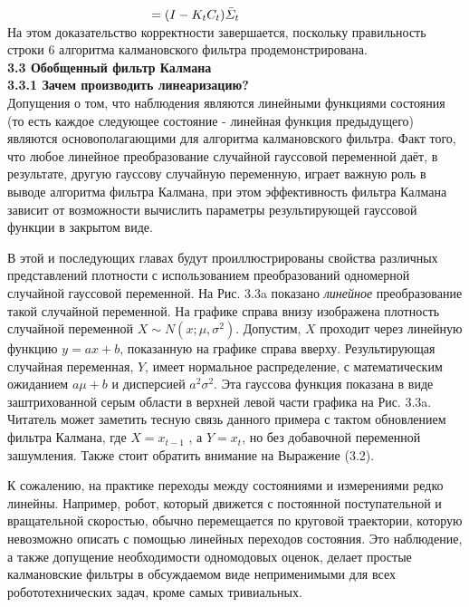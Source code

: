 \documentclass[10pt,a4paper]{article}
\begin{document}
$\hspace{40mm}=(I-K_t C_t)\bar{\varSigma}_t$\\

На этом доказательство корректности завершается, поскольку правильность строки 6 алгоритма калмановского фильтра продемонстрирована.\\

\textbf{3.3 Обобщенный фильтр Калмана}\\
 
\textbf{3.3.1 Зачем производить линеаризацию?}\\

Допущения о том, что наблюдения являются линейными функциями состояния (то есть каждое следующее состояние - линейная функция предыдущего) являются основополагающими для алгоритма калмановского фильтра. Факт того, что любое линейное преобразование случайной гауссовой переменной даёт, в результате, другую гауссову случайную переменную, играет важную роль в выводе алгоритма фильтра Калмана, при этом эффективность фильтра Калмана зависит от возможности вычислить параметры результирующей гауссовой функции в закрытом виде.

В этой и последующих главах будут проиллюстрированы свойства различных представлений плотности с использованием преобразований одномерной случайной гауссовой переменной. На Рис. 3.3a показано \textit{линейное} преобразование такой случайной переменной. На графике справа внизу изображена плотность случайной переменной $X\sim N(x; \mu, \sigma^2)$. Допустим, $X$ проходит через линейную функцию $y = ax + b$, показанную на графике справа вверху. Результирующая случайная переменная, $Y$, имеет нормальное распределение, с математическим ожиданием $a\mu+b$ и дисперсией $a^2\sigma^2$. Эта гауссова функция показана в виде заштрихованной серым области в верхней левой части графика на Рис. 3.3a. Читатель может заметить тесную связь данного примера с тактом обновлением фильтра Калмана, где $X = x_{t-1}$ , а $Y = x_t$,  но без добавочной переменной зашумления. Также стоит обратить внимание на Выражение (3.2).

К сожалению, на практике переходы между состояниями и измерениями редко линейны. Например, робот, который движется с постоянной поступательной и вращательной скоростью, обычно перемещается по круговой траектории, которую невозможно описать с помощью линейных переходов состояния. Это наблюдение, а также допущение необходимости одномодовых оценок, делает простые калмановские фильтры в обсуждаемом виде неприменимыми для всех робототехнических задач, кроме самых тривиальных.
\end{document}
